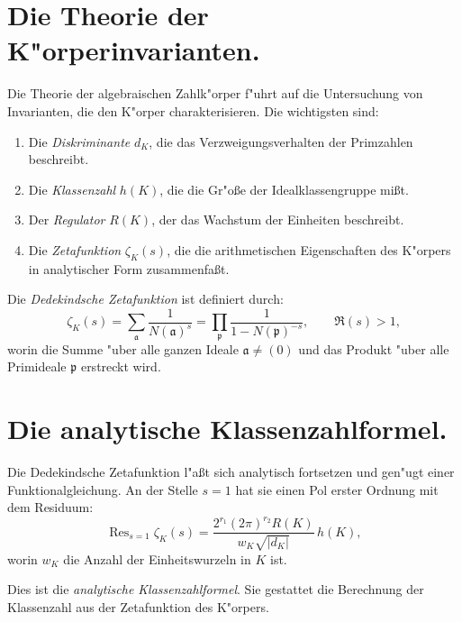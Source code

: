 \documentclass[12pt,a4paper]{article}
\theoremstyle{definition}
\begin{document}
\section{Die Theorie der K"orperinvarianten.}

Die Theorie der algebraischen Zahlk"orper f"uhrt auf die Untersuchung von Invarianten, die den K"orper charakterisieren. Die wichtigsten sind:
\begin{enumerate}[label=\arabic*.]
\item Die \emph{Diskriminante} $d_K$, die das Verzweigungsverhalten der Primzahlen beschreibt.
\item Die \emph{Klassenzahl} $h(K)$, die die Gr"o\ss{}e der Idealklassengruppe mi\ss{}t.
\item Der \emph{Regulator} $R(K)$, der das \glqq Wachstum\grqq{} der Einheiten beschreibt.
\item Die \emph{Zetafunktion} $\zeta_K(s)$, die die arithmetischen Eigenschaften des K"orpers in analytischer Form zusammenfa\ss{}t.
\end{enumerate}

Die \emph{Dedekindsche Zetafunktion} ist definiert durch:
\begin{equation}\tag{1}
\zeta_K(s) = \sum_{\mathfrak{a}} \frac{1}{N(\mathfrak{a})^s} = \prod_{\mathfrak{p}} \frac{1}{1 - N(\mathfrak{p})^{-s}},\qquad \Re(s) > 1,
\end{equation}
worin die Summe "uber alle ganzen Ideale $\mathfrak{a} \neq (0)$ und das Produkt "uber alle Primideale $\mathfrak{p}$ erstreckt wird.

\newpage

\section{Die analytische Klassenzahlformel.}

Die Dedekindsche Zetafunktion l"a\ss{}t sich analytisch fortsetzen und gen"ugt einer Funktionalgleichung. An der Stelle $s = 1$ hat sie einen Pol erster Ordnung mit dem Residuum:
\begin{equation}\tag{1}
\operatorname{Res}_{s=1}\zeta_K(s) = \frac{2^{r_1}(2\pi)^{r_2}R(K)}{w_K\sqrt{|d_K|}}\,h(K),
\end{equation}
worin $w_K$ die Anzahl der Einheitswurzeln in $K$ ist.

Dies ist die \emph{analytische Klassenzahlformel}. Sie gestattet die Berechnung der Klassenzahl aus der Zetafunktion des K"orpers.
\end{document}
